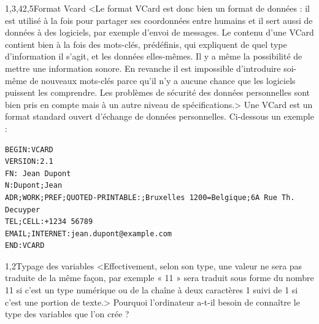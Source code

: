 \begin{quiz}[title={Données et traitements}]
\begin{quizquestion}[b]{1,3,4}{2,5}{Format Vcard}
<Le format VCard est donc bien un format de données : il est utilisé à la fois pour partager ses coordonnées entre humains et il sert aussi de données à des logiciels, par exemple d'envoi de messages. Le contenu d'une VCard contient bien à la fois des mots-clés, prédéfinis, qui expliquent de quel type d'information il s'agit, et les données elles-mêmes. Il y a même la possibilité de mettre une information sonore.
En revanche il est impossible d'introduire soi-même de nouveaux mots-clés parce qu'il n'y a aucune chance que les logiciels puissent les comprendre.
Les problèmes de sécurité des données personnelles sont bien pris en compte mais à un autre niveau de spécifications.>
Une VCard est un format standard ouvert d'échange de données personnelles. Ci-dessous un exemple :
\begin{verbatim}
BEGIN:VCARD
VERSION:2.1
FN: Jean Dupont
N:Dupont;Jean
ADR;WORK;PREF;QUOTED-PRINTABLE:;Bruxelles 1200=Belgique;6A Rue Th. Decuyper
TEL;CELL:+1234 56789
EMAIL;INTERNET:jean.dupont@example.com
END:VCARD
\end{verbatim}
\end{quizquestion}

\begin{quizquestion*}[b]{3}{1,2}{Typage des variables}
<Effectivement, selon son type, une valeur ne sera pas traduite de la même façon, par exemple « 11 » sera traduit sous forme du nombre 11 si c'est un type numérique ou de la chaîne à deux caractères 1 suivi de 1 si c'est une portion de texte.>
Pourquoi l’ordinateur a-t-il besoin de connaître le type des variables que l’on crée ? 
\parnotes
\end{quizquestion*}
\end{quiz}

